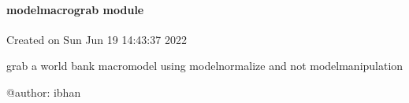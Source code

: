 \documentclass[letterpaper,10pt,english]{sphinxmanual}
\begin{document}
\sphinxstepscope


\paragraph{modelmacrograb module}
\label{\detokenize{onboard/modelmacrograb:module-modelmacrograb}}\label{\detokenize{onboard/modelmacrograb:modelmacrograb-module}}\label{\detokenize{onboard/modelmacrograb::doc}}
\sphinxAtStartPar
Created on Sun Jun 19 14:43:37 2022

\sphinxAtStartPar
grab a world bank macromodel using modelnormalize and not modelmanipulation

\sphinxAtStartPar
@author: ibhan
\end{document}
